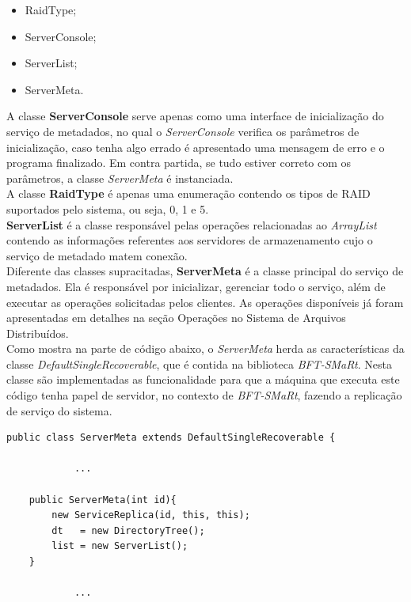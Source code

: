 \begin{itemize}
	\item RaidType;
	\item ServerConsole;
	\item ServerList;
	\item ServerMeta.
\end{itemize}

A classe \textbf{ServerConsole} serve apenas como uma interface de inicialização do serviço de metadados, no qual o \textit{ServerConsole} verifica os parâmetros de inicialização, caso tenha algo errado é apresentado uma mensagem de erro e o programa finalizado. Em contra partida, se tudo estiver correto com os parâmetros, a classe \textit{ServerMeta} é instanciada.
\\

A classe \textbf{RaidType} é apenas uma enumeração contendo os tipos de RAID suportados pelo sistema, ou seja, 0, 1 e 5.
\\

\textbf{ServerList } é a classe responsável pelas operações relacionadas ao \textit{ArrayList} contendo as informações referentes aos servidores de armazenamento cujo o serviço de metadado matem conexão.
\\

Diferente das classes supracitadas, \textbf{ServerMeta} é a classe principal do serviço de metadados. Ela é responsável por inicializar, gerenciar todo o serviço, além de executar as operações solicitadas pelos clientes. As operações disponíveis já foram apresentadas em detalhes na seção Operações no Sistema de Arquivos Distribuídos.
\\

Como mostra na parte de código abaixo, o \textit{ServerMeta} herda as características da classe \textit{DefaultSingleRecoverable}, que é contida na biblioteca \textit{BFT-SMaRt}.
Nesta classe são implementadas as funcionalidade para que a máquina que executa este código tenha papel de servidor, no contexto de \textit{BFT-SMaRt}, fazendo a replicação de serviço do sistema. 

\begin{lstlisting}[basicstyle=\ttfamily\footnotesize, frame=single]		
public class ServerMeta extends DefaultSingleRecoverable {
	
			...
		
	public ServerMeta(int id){
		new ServiceReplica(id, this, this);
		dt   = new DirectoryTree();
		list = new ServerList(); 
	}

			...
\end{lstlisting}	

